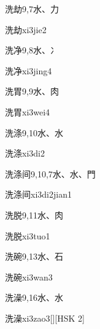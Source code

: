 \begin{entry}{洗劫}{9,7}{⽔、⼒}
  \begin{phonetics}{洗劫}{xi3jie2}
  \end{phonetics}
\end{entry}

\begin{entry}{洗净}{9,8}{⽔、⼎}
  \begin{phonetics}{洗净}{xi3jing4}
  \end{phonetics}
\end{entry}

\begin{entry}{洗胃}{9,9}{⽔、⾁}
  \begin{phonetics}{洗胃}{xi3wei4}
  \end{phonetics}
\end{entry}

\begin{entry}{洗涤}{9,10}{⽔、⽔}
  \begin{phonetics}{洗涤}{xi3di2}
  \end{phonetics}
\end{entry}

\begin{entry}{洗涤间}{9,10,7}{⽔、⽔、⾨}
  \begin{phonetics}{洗涤间}{xi3di2jian1}
  \end{phonetics}
\end{entry}

\begin{entry}{洗脱}{9,11}{⽔、⾁}
  \begin{phonetics}{洗脱}{xi3tuo1}
  \end{phonetics}
\end{entry}

\begin{entry}{洗碗}{9,13}{⽔、⽯}
  \begin{phonetics}{洗碗}{xi3wan3}
  \end{phonetics}
\end{entry}

\begin{entry}{洗澡}{9,16}{⽔、⽔}
  \begin{phonetics}{洗澡}{xi3zao3}[][HSK 2]
  \end{phonetics}
\end{entry}

